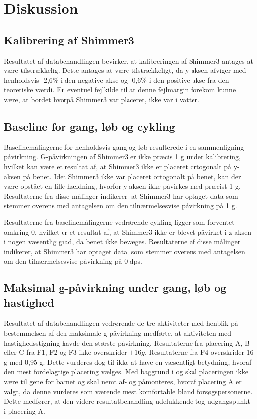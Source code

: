 \section{Diskussion}
\subsection{Kalibrering af Shimmer3}
Resultatet af databehandlingen bevirker, at kalibreringen af Shimmer3 antages at være tilstrækkelig. Dette antages at være tilstrækkeligt, da y-aksen  afviger med henholdsvis -2,6\% i den negative akse og -0,6\% i den positive akse fra den teoretiske værdi. En eventuel fejlkilde til at denne fejlmargin forekom kunne være, at bordet hvorpå Shimmer3 var placeret, ikke var i vatter.

\subsection{Baseline for gang, løb og cykling}
Baselinemålingerne for henholdsvis gang og løb resulterede i en sammenligning påvirkning. G-påvirkningen af Shimmer3 er ikke præcis 1 g under kalibrering, hvilket kan være et resultat af, at Shimmer3 ikke er placeret ortogonalt på y-aksen på benet. Idet Shimmer3 ikke var placeret ortogonalt på benet, kan der være opstået en lille hældning, hvorfor y-aksen ikke påvirkes med præcist 1 g. Resultaterne fra disse målinger indikerer, at Shimmer3 har optaget data som stemmer overens med antagelsen om den tilnærmelsesvise påvirkning på 1 g. 

Resultaterne fra baselinemålingerne vedrørende cykling ligger som forventet omkring 0, hvilket er et resultat af, at Shimmer3 ikke er blevet påvirket i z-aksen i nogen væsentlig grad, da benet ikke bevæges. Resultaterne af disse målinger indikerer, at Shimmer3 har optaget data, som stemmer overens med antagelsen om den tilnærmelsesvise påvirkning på 0 dps. 

\subsection{Maksimal g-påvirkning under gang, løb og hastighed} \label{app:maxg}
Resultatet af databehandlingen vedrørende de tre aktiviteter med henblik på bestemmelsen af den maksimale g-påvirkning medførte, at aktiviteten med hastighedsstigning havde den største påvirkning. Resultaterne fra placering A, B eller C fra F1, F2 og F3 ikke overskrider $\pm 16g$. Resultaterne fra F4 overskrider 16 g med 0,95 g. Dette vurderes dog til ikke at have en væsentligt betydning, hvoraf den mest fordelagtige placering vælges. Med baggrund i  og  skal placeringen ikke være til gene for barnet og skal nemt af- og påmonteres, hvoraf placering A er valgt, da denne vurderes som værende mest komfortable bland forsøgspersonerne. Dette medfører, at den videre resultatbehandling udelukkende tog udgangspunkt i placering A. 

